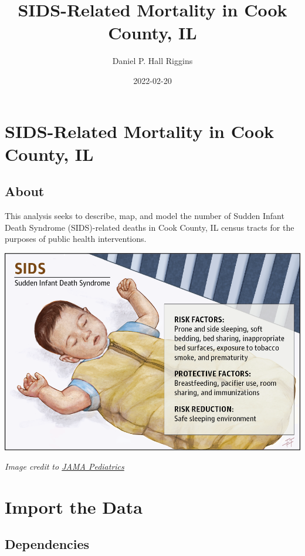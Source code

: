 \documentclass[
]{book}
\title{SIDS-Related Mortality in Cook County, IL}
\author{Daniel P. Hall Riggins}
\date{2022-02-20}
\begin{document}
\maketitle

{
\setcounter{tocdepth}{1}
\tableofcontents
}
\hypertarget{sids-related-mortality-in-cook-county-il}{%
\chapter{SIDS-Related Mortality in Cook County, IL}\label{sids-related-mortality-in-cook-county-il}}

\hypertarget{about}{%
\section{About}\label{about}}

This analysis seeks to describe, map, and model the number of Sudden Infant Death Syndrome (SIDS)-related deaths in Cook County, IL census tracts for the purposes of public health interventions.

\includegraphics[width=13.14in]{media/safe_sleep}

\emph{Image credit to \href{https://jamanetwork.com/journals/jamapediatrics/fullarticle/2599897}{JAMA Pediatrics}}

\hypertarget{import-the-data}{%
\chapter{Import the Data}\label{import-the-data}}

\hypertarget{dependencies}{%
\section{Dependencies}\label{dependencies}}
\end{document}
